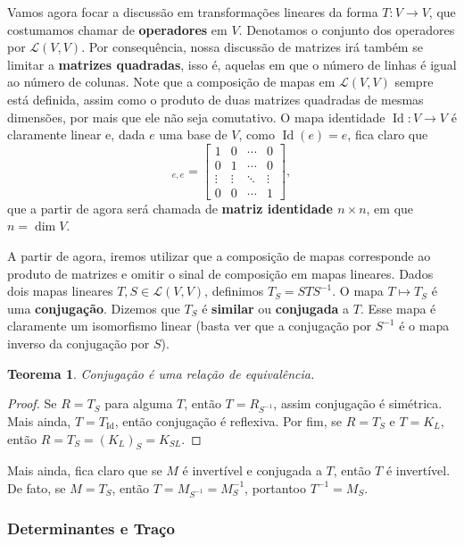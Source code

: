 \documentclass{article}
\newtheorem{theorem}[definition]{Teorema}
\DeclareMathOperator{\Id}{Id}
\begin{document}
Vamos agora focar a discussão em transformações lineares da forma $T \colon V \to V$, que costumamos chamar de \textbf{operadores} em $V$. Denotamos o conjunto dos operadores por $\mathcal{L}(V,V)$. Por consequência, nossa discussão de matrizes irá também se limitar a \textbf{matrizes quadradas}, isso é, aquelas em que o número de linhas é igual ao número de colunas. Note que a composição de mapas em $\mathcal{L}(V,V)$ sempre está definida, assim como o produto de duas matrizes quadradas de mesmas dimensões, por mais que ele não seja comutativo. O mapa identidade $\Id \colon V \to V$ é claramente linear e, dada $e$ uma base de $V$, como $\Id(e) = e$, fica claro que \begin{equation}
    [\Id]_{e,e} = \begin{bmatrix}
        1 & 0 & \cdots & 0 \\ 0 & 1 & \cdots & 0 \\ \vdots & \vdots & \ddots & \vdots \\ 0 & 0 & \cdots & 1
    \end{bmatrix},
\end{equation} que a partir de agora será chamada de \textbf{matriz identidade $n \times n$}, em que $n = \dim V$.

A partir de agora, iremos utilizar que a composição de mapas corresponde ao produto de matrizes e omitir o sinal de composição em mapas lineares. Dados dois mapas lineares $T, S \in \mathcal{L}(V,V)$, definimos $T_S = STS^{-1}$. O mapa $T \mapsto T_S$ é uma \textbf{conjugação}. Dizemos que $T_S$ é \textbf{similar} ou \textbf{conjugada} a $T$. Esse mapa é claramente um isomorfismo linear (basta ver que a conjugação por $S^{-1}$ é o mapa inverso da conjugação por $S$).

\begin{theorem}
    Conjugação é uma relação de equivalência.
\end{theorem}
\begin{proof}
    Se $R = T_S$ para alguma $T$, então $T = R_{S^{-1}}$, assim conjugação é simétrica. Mais ainda, $T = T_{\Id}$, então conjugação é reflexiva. Por fim, se $R = T_S$ e $T = K_L$, então $R = T_S = (K_L)_S = K_{SL}$. 
\end{proof}

Mais ainda, fica claro que se $M$ é invertível e conjugada a $T$, então $T$ é invertível. De fato, se $M = T_S$, então $T = M_{S^{-1}} = M_S^{-1}$, portantoo $T^{-1} = M_S$.

\subsubsection*{Determinantes e Traço}
\end{document}
